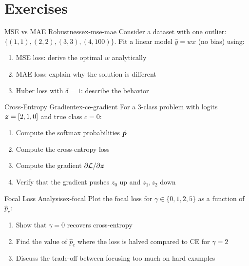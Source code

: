 \documentclass[../../main.tex]{subfiles}
\begin{document}
\section{Exercises}
\label{sec:loss-exercises}

\begin{exercise}{MSE vs MAE Robustness}{ex-mse-mae}
Consider a dataset with one outlier: $\{(1, 1), (2, 2), (3, 3), (4, 100)\}$. Fit a linear model $\hat{y} = wx$ (no bias) using:
\begin{enumerate}[label=(\alph*)]
    \item MSE loss: derive the optimal $w$ analytically
    \item MAE loss: explain why the solution is different
    \item Huber loss with $\delta = 1$: describe the behavior
\end{enumerate}
\end{exercise}

\begin{exercise}{Cross-Entropy Gradient}{ex-ce-gradient}
For a 3-class problem with logits $\boldsymbol{z} = [2, 1, 0]$ and true class $c = 0$:
\begin{enumerate}[label=(\alph*)]
    \item Compute the softmax probabilities $\hat{\boldsymbol{p}}$
    \item Compute the cross-entropy loss
    \item Compute the gradient $\partial \mathcal{L} / \partial \boldsymbol{z}$
    \item Verify that the gradient pushes $z_0$ up and $z_1, z_2$ down
\end{enumerate}
\end{exercise}

\begin{exercise}{Focal Loss Analysis}{ex-focal}
Plot the focal loss for $\gamma \in \{0, 1, 2, 5\}$ as a function of $\hat{p}_c$:
\begin{enumerate}[label=(\alph*)]
    \item Show that $\gamma = 0$ recovers cross-entropy
    \item Find the value of $\hat{p}_c$ where the loss is halved compared to CE for $\gamma = 2$
    \item Discuss the trade-off between focusing too much on hard examples
\end{enumerate}
\end{exercise}
\end{document}
